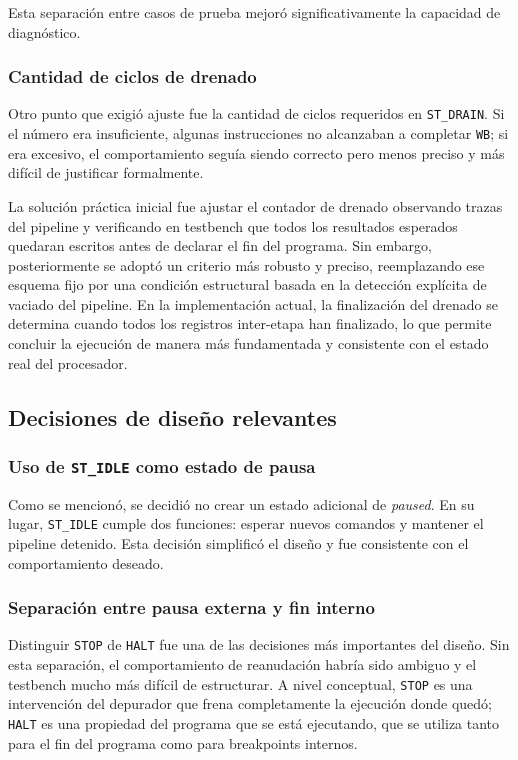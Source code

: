 Esta separación entre casos de prueba mejoró significativamente la capacidad de diagnóstico.

\subsubsection{Cantidad de ciclos de drenado}

Otro punto que exigió ajuste fue la cantidad de ciclos requeridos en \texttt{ST\_DRAIN}. Si el número era insuficiente, algunas instrucciones no alcanzaban a completar \texttt{WB}; si era excesivo, el comportamiento seguía siendo correcto pero menos preciso y más difícil de justificar formalmente.

La solución práctica inicial fue ajustar el contador de drenado observando trazas del pipeline y verificando en testbench que todos los resultados esperados quedaran escritos antes de declarar el fin del programa. Sin embargo, posteriormente se adoptó un criterio más robusto y preciso, reemplazando ese esquema fijo por una condición estructural basada en la detección explícita de vaciado del pipeline. En la implementación actual, la finalización del drenado se determina cuando todos los registros inter-etapa han finalizado, lo que permite concluir la ejecución de manera más fundamentada y consistente con el estado real del procesador.

\subsection{Decisiones de diseño relevantes}

\subsubsection{Uso de \texttt{ST\_IDLE} como estado de pausa}

Como se mencionó, se decidió no crear un estado adicional de \textit{paused}. En su lugar, \texttt{ST\_IDLE} cumple dos funciones: esperar nuevos comandos y mantener el pipeline detenido. Esta decisión simplificó el diseño y fue consistente con el comportamiento deseado.

\subsubsection{Separación entre pausa externa y fin interno}

Distinguir \texttt{STOP} de \texttt{HALT} fue una de las decisiones más importantes del diseño. Sin esta separación, el comportamiento de reanudación habría sido ambiguo y el testbench mucho más difícil de estructurar. A nivel conceptual, \texttt{STOP} es una intervención del depurador que frena completamente la ejecución donde quedó; \texttt{HALT} es una propiedad del programa que se está ejecutando, que se utiliza tanto para el fin del programa como para breakpoints internos.

